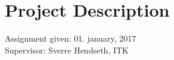 \setcounter{page}{0}
\newpage
{}
\section*{Project Description}
\label{sec:project_description}



\begin{flushleft}
Assignment given: 01. january, 2017\\
Supervisor: Sverre Hendseth, ITK
\end{flushleft}


\afterpage{\blankpage}
